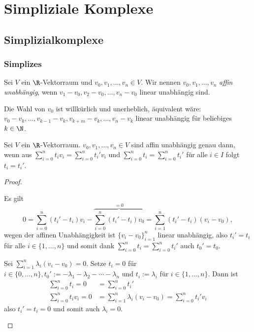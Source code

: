 
\chapter{Simpliziale Komplexe}

\section{Simplizialkomplexe}

\subsection{Simplizes}

\begin{df}
	Sei $V$ ein $\R$-Vektorraum und $v_0, v_1, \dotsc, v_n \in V$.
	Wir nennen $v_0, v_1, \dotsc, v_n$ \emph{affin unabhängig}, wenn $v_1 - v_0, v_2 - v_0, \dotsc, v_n - v_0$ linear unabhängig sind.
	\begin{note}
		Die Wahl von $v_0$ ist willkürlich und unerheblich, äquivalent wäre: $v_0 - v_k, \dotsc, v_{k-1} - v_k, v_{k+m} - v_k, \dotsc, v_n - v_k$ linear unabhängig für beliebiges $k \in \N$.
	\end{note}
\end{df}

\begin{prop} \label{prop:affine_independent}
	Sei $V$ ein $\R$-Vektorraum.
	$v_0, v_1, \dotsc, v_n \in V$ sind affin unabhängig genau dann, wenn aus $\sum_{i=0}^n t_i v_i = \sum_{i=0}^n t_i' v_i$ und $\sum_{i=0}^n t_i = \sum_{i=0}^n t_i'$ für alle $i \in I$ folgt $t_i = t_i'$.
	\begin{proof}
		\begin{segnb}[„$\implies$“]
			Es gilt
			\[
				0
				= \sum_{i=0}^n (t_i' - t_i) v_i - \overbrace{\sum_{i=0}^n (t_i' - t_i) v_0}^{= 0}
				= \sum_{i=1}^n (t_i' - t_i) (v_i - v_0),
			\]
			wegen der affinen Unabhängigkeit ist $\{v_i - v_0\}_{i=1}^n$ linear unabhängig, also $t_i' = t_i$ für alle $i \in \{1, \dotsc, n\}$ und somit dank $\sum_{i=0}^n t_i = \sum_{i=0}^n t_i'$ auch $t_0' = t_0$.
		\end{segnb}
		\begin{segnb}[„$\implies$“]
			Sei $\sum_{i=1}^n \lambda_i (v_i - v_0) = 0$.
			Setze $t_i = 0$ für $i \in \{0, \dotsc, n\}, t_0' := -\lambda_1 - \lambda_2 - \dotsb - \lambda_n$ und $t_i := \lambda_i$ für $i \in \{1, \dotsc, n\}$.
			Dann ist
			\begin{align*}
				\sum_{i=0}^n t_i = 0 &= \sum_{i=0}^n t_i' \\
				\sum_{i=0}^n t_i v_i = 0 &= \sum_{i=1}^n \lambda_i (v_i - v_0) = \sum_{i=0}^n t_i' v_i
			\end{align*}
			also $t_i' = t_i = 0$ und somit auch $\lambda_i = 0$.
		\end{segnb}
	\end{proof}
\end{prop}

